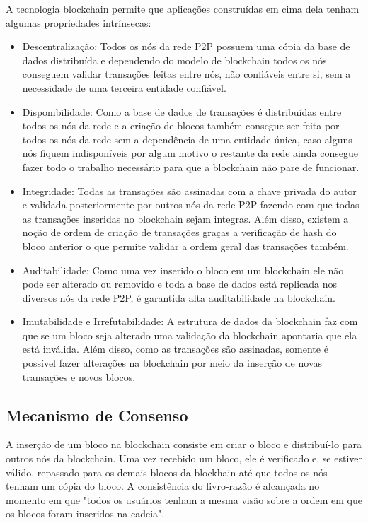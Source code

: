 \documentclass[12pt]{article}
\begin{document}
A tecnologia blockchain permite que aplicações construídas em cima dela tenham algumas propriedades intrínsecas:
\begin{itemize}
    \item Descentralização: Todos os nós da rede P2P possuem uma cópia da base de dados distribuída e dependendo do modelo de blockchain todos os nós conseguem validar transações feitas entre nós, não confiáveis entre si, sem a necessidade de uma terceira entidade confiável.
    \item Disponibilidade: Como a base de dados de transações é distribuídas entre todos os nós da rede e a criação de blocos também consegue ser feita por todos os nós da rede sem a dependência de uma entidade única, caso alguns nós fiquem indisponíveis por algum motivo o restante da rede ainda consegue fazer todo o trabalho necessário para que a blockchain não pare de funcionar.
    \item Integridade: Todas as transações são assinadas com a chave privada do autor e validada posteriormente por outros nós da rede P2P fazendo com que todas as transações inseridas no blockchain sejam integras. Além disso, existem a noção de ordem de criação de transações graças a verificação de hash do bloco anterior o que permite validar a ordem geral das transações também.
    \item Auditabilidade: Como uma vez inserido o bloco em um blockchain ele não pode ser alterado ou removido e toda a base de dados está replicada nos diversos nós da rede P2P, é garantida alta auditabilidade na blockchain.
    \item Imutabilidade e Irrefutabilidade: A estrutura de dados da blockchain faz com que se um bloco seja alterado uma validação da blockchain apontaria que ela está inválida. Além disso, como as transações são assinadas, somente é possível fazer alterações na blockchain por meio da inserção de novas transações e novos blocos.
\end{itemize}

\subsection{Mecanismo de Consenso}

A inserção de um bloco na blockchain consiste em criar o bloco e distribuí-lo para outros nós da blockchain. Uma vez recebido um bloco, ele é verificado e, se estiver válido, repassado para os demais blocos da blockhain até que todos os nós tenham um cópia do bloco. A consistência do livro-razão é alcançada no momento em que "todos os usuários tenham a mesma visão sobre a ordem em que os blocos foram inseridos na cadeia"\cite{miers2019analise}.
\end{document}
